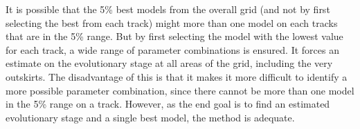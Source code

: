 It is possible that the 5\% best models from the overall grid (and not by first selecting the best from each track) might more than one model on each tracks that are in the 5\% range. But by first selecting the model with the lowest \chis value for each track, a wide range of parameter combinations is ensured. It forces an estimate on the evolutionary stage at all areas of the grid, including the very outskirts. The disadvantage of this is that it makes it more difficult to identify a more possible parameter combination, since there cannot be more than one model in the 5\% range on a track. However, as the end goal is to find an estimated evolutionary stage and a single best model, the method is adequate.



